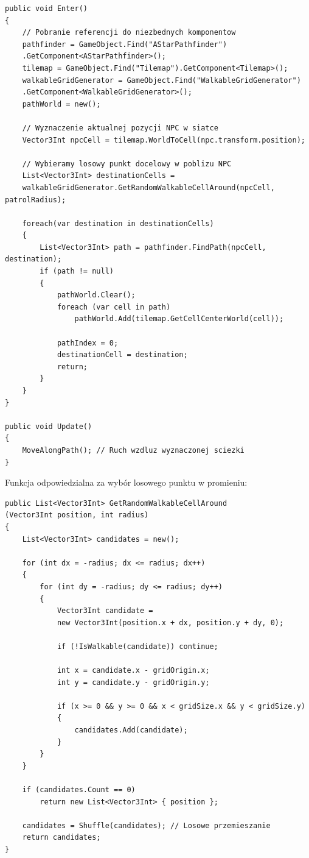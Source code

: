 \documentclass[a4paper,12pt]{book} %
\begin{document}
\begin{lstlisting}[language=CSharp, caption={Implementacja stanu Patrol}, label={lst:patrol_state}]
public void Enter()
{
    // Pobranie referencji do niezbednych komponentow
    pathfinder = GameObject.Find("AStarPathfinder")
    .GetComponent<AStarPathfinder>();
    tilemap = GameObject.Find("Tilemap").GetComponent<Tilemap>();
    walkableGridGenerator = GameObject.Find("WalkableGridGenerator")
    .GetComponent<WalkableGridGenerator>();
    pathWorld = new();

    // Wyznaczenie aktualnej pozycji NPC w siatce
    Vector3Int npcCell = tilemap.WorldToCell(npc.transform.position);

    // Wybieramy losowy punkt docelowy w poblizu NPC
    List<Vector3Int> destinationCells = 
    walkableGridGenerator.GetRandomWalkableCellAround(npcCell, patrolRadius);

    foreach(var destination in destinationCells)
    {
        List<Vector3Int> path = pathfinder.FindPath(npcCell, destination);
        if (path != null)
        {
            pathWorld.Clear();
            foreach (var cell in path)
                pathWorld.Add(tilemap.GetCellCenterWorld(cell));

            pathIndex = 0;
            destinationCell = destination;
            return;
        }
    }
}

public void Update()
{
    MoveAlongPath(); // Ruch wzdluz wyznaczonej sciezki
}
\end{lstlisting}

Funkcja odpowiedzialna za wybór losowego punktu w promieniu:

\begin{lstlisting}[language=CSharp, caption={Losowanie punktu patrolu}, label={lst:random_walkable}]
public List<Vector3Int> GetRandomWalkableCellAround
(Vector3Int position, int radius)
{ 
    List<Vector3Int> candidates = new();

    for (int dx = -radius; dx <= radius; dx++)
    {
        for (int dy = -radius; dy <= radius; dy++)
        {
            Vector3Int candidate = 
            new Vector3Int(position.x + dx, position.y + dy, 0);

            if (!IsWalkable(candidate)) continue;

            int x = candidate.x - gridOrigin.x;
            int y = candidate.y - gridOrigin.y;

            if (x >= 0 && y >= 0 && x < gridSize.x && y < gridSize.y)
            {
                candidates.Add(candidate);
            }
        }
    }

    if (candidates.Count == 0)
        return new List<Vector3Int> { position };

    candidates = Shuffle(candidates); // Losowe przemieszanie
    return candidates;
}
\end{lstlisting}
\end{document}

